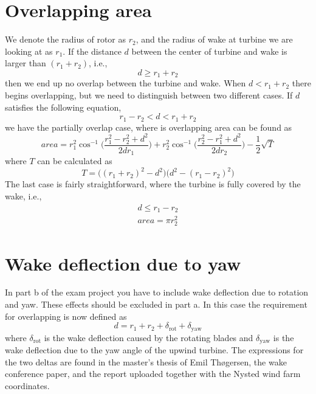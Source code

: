 \documentclass[a4paper, 11pt]{article}
\begin{document}
\section{Overlapping area}
We denote the radius of rotor as $r_2$, and the radius of wake at turbine we are looking at as $r_1$. If the distance $d$ between the center of turbine and wake is larger than $(r_1+r_2)$, i.e.,
\begin{equation}
d \geq r_1+r_2
\end{equation}
then we end up no overlap between the turbine and wake. When $d < r_1+r_2$ there begins overlapping, but we need to distinguish between two different cases. If $d$ satisfies the following equation, 
\begin{equation}
r_1-r_2 < d < r_1+r_2
\end{equation}
we have the partially overlap case, where is overlapping area can be found as
\begin{equation}
area = r^2_1 \cos^{-1}\bigg(\frac{r^2_1-r^2_2+d^2}{2dr_1}\bigg)
      +r^2_2 \cos^{-1}\bigg(\frac{r^2_2-r^2_1+d^2}{2dr_2}\bigg)
      -\frac{1}{2}\sqrt{T}
\end{equation}
where $T$ can be calculated as 
\begin{equation}
T = \Big((r_1+r_2)^2-d^2\Big)\Big(d^2-(r_1-r_2)^2 \Big)
\end{equation}
The last case is fairly straightforward, where the turbine is fully covered by the wake, i.e.,
\begin{equation}
	\begin{aligned}
	d \leq r_1-r_2 \\
	area = \pi r^2_2
	\end{aligned}
\end{equation}

\section{Wake deflection due to yaw}
In part b of the exam project you have to include wake deflection due to rotation and yaw. These effects should be excluded in part a. In this case the requirement for overlapping is now defined as
\begin{equation}
d = r_1+r_2+\delta_\text{rot}+\delta_\text{yaw}
\end{equation}
where $\delta_\text{rot}$ is the wake deflection caused by the rotating blades and $\delta_\text{yaw}$ is the wake deflection due to the yaw angle of the upwind turbine. The expressions for the two deltas are found in the master's thesis of Emil Thøgersen, the wake conference paper, and the report uploaded together with the Nysted wind farm coordinates. 
\end{document}
